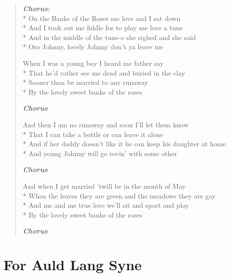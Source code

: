 \documentclass[9pt,twoside]{extarticle}
\newenvironment{xverse}{
	\begin{verse}
	\fontsize{8.5}{10.5}\selectfont
	}
	{
	\end{verse}
	\penalty 0
}
\newcommand{\chorusdef}{\textbf{\emph{Chorus:}}\\*}
\newcommand{\chorusmark}[1][1]{%
\vspace{-0.5\stanzaskip}%
\textbf{\emph{Chorus \ifthenelse{\equal{#1}{1}}{}{$\times$ #1}}}%
\vspace{-0.5\stanzaskip}%
}
\begin{document}
\begin{xverse}
\chorusdef
On the Banks of the Roses me love and I sat down \\*
And I took out me fiddle for to play me love a tune \\*
And in the middle of the tune-o she sighed and she said \\*
Oro Johnny, lovely Johnny don’t ya leave me

When I was a young boy I heard me father say \\*
That he’d rather see me dead and buried in the clay \\*
Sooner than be married to any runaway \\*
By the lovely sweet banks of the roses

\chorusmark

And then I am no runaway and soon I’ll let them know \\*
That I can take a bottle or can leave it alone \\*
And if her daddy doesn’t like it he can keep his daughter at home \\*
And young Johnny will go rovin’ with some other

\chorusmark

And when I get married ’twill be in the month of May \\*
When the leaves they are green and the meadows they are gay \\*
And me and me true love we’ll sit and sport and play \\*
By the lovely sweet banks of the roses

\chorusmark
\end{xverse}

\section{For Auld Lang Syne}
\end{document}
